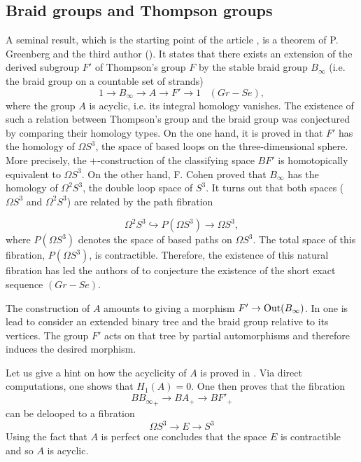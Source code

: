 \documentclass[twoside]{irmaems}
\theoremstyle{plain}
\theoremstyle{definition}
\theoremstyle{remark}
\begin{document}
\subsection{Braid groups and Thompson groups}


A seminal result, which is the starting point of the article \cite{ka-se}, is a theorem of P. Greenberg and the third author (\cite{gr-se}). It states that there exists 
an extension of the derived subgroup $F'$ of Thompson's group $F$ by the stable braid group  $B_{\infty}$ (i.e. the braid group on a countable set of strands) 
$$ 1\rightarrow B_{\infty}\longrightarrow A\longrightarrow F'\rightarrow 1\;\;\; (Gr-Se),$$
where the group  $A$ is acyclic, i.e. its integral homology vanishes. 
The existence of such a relation 
between Thompson's group and the braid group was conjectured by comparing their homology types.
On the one hand, it is proved in \cite{gh-se} that $F'$ has the homology of $\Omega S^3$, the space of based loops 
on the three-dimensional sphere. More precisely, the +-construction of the classifying space $BF'$ is homotopically 
equivalent to $\Omega S^3$. On the other hand,  F. Cohen proved that $B_{\infty}$ has the homology 
of  $\Omega^2 S^3$, the double loop space of $S^3$.
It turns out that both spaces ($\Omega S^3$ and $\Omega^2 S^3$)  are related by the path fibration 

$$\Omega^2 S^3\hookrightarrow  P(\Omega S^3)\rightarrow  \Omega S^3,$$   
where $P(\Omega S^3)$ denotes the space of based paths on $\Omega S^3$. The total space of this fibration,  $P(\Omega S^3)$, is contractible.  
Therefore, the existence of this natural fibration has led the authors of \cite{gr-se} to conjecture the existence of the short exact sequence
 $(Gr-Se)$.


\vspace{0.1cm}\noindent
The construction of $A$ amounts to giving 
a morphism $F'\to {\rm Out}(B_{\infty})$. 
In \cite{gr-se} one is lead to consider an extended binary tree and the braid group relative to its vertices. The group $F'$ 
acts on that tree by partial automorphisms and therefore induces the 
desired morphism. 


\vspace{0.1cm}\noindent
Let us give a hint on how the acyclicity of $A$ is proved in \cite{gr-se}. 
Via direct computations, one shows that $H_1(A)=0$. One then proves that 
the fibration 
\[ {BB_{\infty}}_+ \to BA_+ \to BF'_+\]
can be delooped to a fibration 
\[ \Omega S^3 \to E \to S^3\]
Using the fact that $A$ is perfect one concludes that the space $E$ is contractible and so $A$ is acyclic.  
\end{document}
